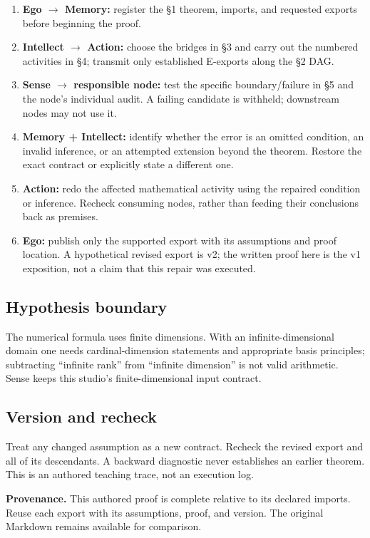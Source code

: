 \documentclass[preprint,12pt,aps,pra,showkeys,amsmath,amssymb,superscriptaddress,floatfix]{revtex4-2}
\theoremstyle{definition}
\theoremstyle{remark}
\providecommand{\tightlist}{\setlength{\itemsep}{2pt}\setlength{\parskip}{0pt}}
\begin{document}
\begin{enumerate}
\def\labelenumi{\arabic{enumi}.}
\tightlist
\item
  \textbf{Ego \(\to\) Memory:} register the §1 theorem, imports, and
  requested exports before beginning the proof.
\item
  \textbf{Intellect \(\to\) Action:} choose the bridges in §3 and carry
  out the numbered activities in §4; transmit only established E-exports
  along the §2 DAG.
\item
  \textbf{Sense \(\to\) responsible node:} test the specific
  boundary/failure in §5 and the node's individual audit. A failing
  candidate is withheld; downstream nodes may not use it.
\item
  \textbf{Memory + Intellect:} identify whether the error is an omitted
  condition, an invalid inference, or an attempted extension beyond the
  theorem. Restore the exact contract or explicitly state a different
  one.
\item
  \textbf{Action:} redo the affected mathematical activity using the
  repaired condition or inference. Recheck consuming nodes, rather than
  feeding their conclusions back as premises.
\item
  \textbf{Ego:} publish only the supported export with its assumptions
  and proof location. A hypothetical revised export is v2; the written
  proof here is the v1 exposition, not a claim that this repair was
  executed.
\end{enumerate}

\subsection{Hypothesis boundary}
The numerical formula uses finite dimensions. With an
infinite-dimensional domain one needs cardinal-dimension statements and
appropriate basis principles; subtracting ``infinite rank'' from
``infinite dimension'' is not valid arithmetic. Sense keeps this
studio's finite-dimensional input contract.

\subsection{Version and recheck}
Treat any changed assumption as a new contract. Recheck the revised
export and all of its descendants. A backward diagnostic never
establishes an earlier theorem. This is an authored teaching trace, not
an execution log.

\par\medskip\begingroup\small\linespread{1.0}\selectfont\noindent\textbf{Provenance.} This authored proof is complete relative to its declared imports. Reuse
each export with its assumptions, proof, and version. The original
Markdown remains available for comparison.
\par\endgroup
\end{document}

